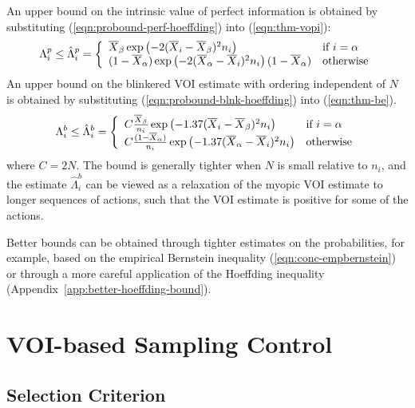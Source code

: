 \documentclass{article}
\begin{document}
An upper bound on the intrinsic value of perfect information is obtained by substituting
(\ref{eqn:probound-perf-hoeffding}) into (\ref{eqn:thm-vopi}):
\begin{equation}
  \Lambda_i^p \le \hat\Lambda_i^p=\left\{
  \begin{array}{l l}
    \overline X_\beta\exp\left(- 2(\overline X_i - \overline X_\beta)^2 n_i \right) & \mbox{if $i=\alpha$} \\
    (1-\overline  X_\alpha)\exp\left(- 2(\overline X_\alpha - \overline X_i)^2 n_i \right)(1-\overline  X_\alpha)  &  \mbox{otherwise}
  \end{array} \right.
\label{eqn:bound-perf-hoeffding}
\end{equation}
An upper bound on the blinkered VOI estimate with ordering independent of $N$ is obtained
by substituting (\ref{eqn:probound-blnk-hoeffding}) into (\ref{eqn:thm-be}).
\begin{equation}
  \Lambda_i^b \le \hat\Lambda_i^b=\left\{
  \begin{array}{l l}
    C \frac {\overline X_\beta} {n_i}\exp\left(- 1.37(\overline X_i - \overline X_\beta)^2 n_i\right)
      & \mbox{if $i=\alpha$} \\
    C \frac {(1-\overline  X_\alpha)} {n_i} \exp\left(- 1.37(\overline X_\alpha - \overline X_i)^2 n_i\right)
      &  \mbox{otherwise}
  \end{array} \right.
\label{eqn:bound-blnk-hoeffding}
\end{equation}
where $C=2N$. The bound is generally tighter when $N$ is small relative to $n_i$,
and the estimate $\hat\Lambda_i^b$ can be viewed as a relaxation of the myopic VOI
estimate to longer sequences of actions, such
that the VOI estimate is positive for some of the actions.

Better bounds can be obtained through tighter estimates on the
probabilities, for example, based on the empirical Bernstein inequality
(\ref{eqn:conc-empbernstein}) or through a more careful application of
the Hoeffding inequality (Appendix~\ref{app:better-hoeffding-bound}).

\section{VOI-based Sampling Control}

\subsection{Selection Criterion}
\end{document}
